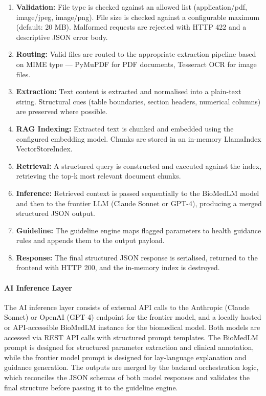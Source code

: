 \begin{enumerate}
    \item \textbf{Validation:} File type is checked against an allowed list (application/pdf, image/jpeg, image/png). File size is checked against a configurable maximum (default: 20 MB). Malformed requests are rejected with HTTP 422 and a descriptive JSON error body.
    \item \textbf{Routing:} Valid files are routed to the appropriate extraction pipeline based on MIME type --- PyMuPDF for PDF documents, Tesseract OCR for image files.
    \item \textbf{Extraction:} Text content is extracted and normalised into a plain-text string. Structural cues (table boundaries, section headers, numerical columns) are preserved where possible.
    \item \textbf{RAG Indexing:} Extracted text is chunked and embedded using the configured embedding model. Chunks are stored in an in-memory LlamaIndex VectorStoreIndex.
    \item \textbf{Retrieval:} A structured query is constructed and executed against the index, retrieving the top-k most relevant document chunks.
    \item \textbf{Inference:} Retrieved context is passed sequentially to the BioMedLM model and then to the frontier LLM (Claude Sonnet or GPT-4), producing a merged structured JSON output.
    \item \textbf{Guideline:} The guideline engine maps flagged parameters to health guidance rules and appends them to the output payload.
    \item \textbf{Response:} The final structured JSON response is serialised, returned to the frontend with HTTP 200, and the in-memory index is destroyed.
\end{enumerate}

\paragraph{AI Inference Layer}
The AI inference layer consists of external API calls to the Anthropic (Claude Sonnet) or OpenAI (GPT-4) endpoint for the frontier model, and a locally hosted or API-accessible BioMedLM instance for the biomedical model. Both models are accessed via REST API calls with structured prompt templates. The BioMedLM prompt is designed for structured parameter extraction and clinical annotation, while the frontier model prompt is designed for lay-language explanation and guidance generation. The outputs are merged by the backend orchestration logic, which reconciles the JSON schemas of both model responses and validates the final structure before passing it to the guideline engine.

